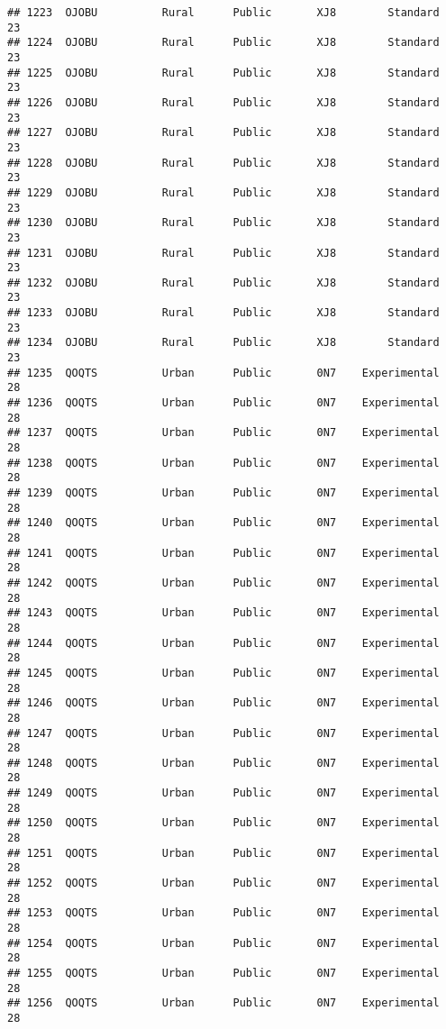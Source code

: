 \documentclass[
]{article}
\begin{document}
\begin{verbatim}
## 1223  OJOBU          Rural      Public       XJ8        Standard        23
## 1224  OJOBU          Rural      Public       XJ8        Standard        23
## 1225  OJOBU          Rural      Public       XJ8        Standard        23
## 1226  OJOBU          Rural      Public       XJ8        Standard        23
## 1227  OJOBU          Rural      Public       XJ8        Standard        23
## 1228  OJOBU          Rural      Public       XJ8        Standard        23
## 1229  OJOBU          Rural      Public       XJ8        Standard        23
## 1230  OJOBU          Rural      Public       XJ8        Standard        23
## 1231  OJOBU          Rural      Public       XJ8        Standard        23
## 1232  OJOBU          Rural      Public       XJ8        Standard        23
## 1233  OJOBU          Rural      Public       XJ8        Standard        23
## 1234  OJOBU          Rural      Public       XJ8        Standard        23
## 1235  QOQTS          Urban      Public       0N7    Experimental        28
## 1236  QOQTS          Urban      Public       0N7    Experimental        28
## 1237  QOQTS          Urban      Public       0N7    Experimental        28
## 1238  QOQTS          Urban      Public       0N7    Experimental        28
## 1239  QOQTS          Urban      Public       0N7    Experimental        28
## 1240  QOQTS          Urban      Public       0N7    Experimental        28
## 1241  QOQTS          Urban      Public       0N7    Experimental        28
## 1242  QOQTS          Urban      Public       0N7    Experimental        28
## 1243  QOQTS          Urban      Public       0N7    Experimental        28
## 1244  QOQTS          Urban      Public       0N7    Experimental        28
## 1245  QOQTS          Urban      Public       0N7    Experimental        28
## 1246  QOQTS          Urban      Public       0N7    Experimental        28
## 1247  QOQTS          Urban      Public       0N7    Experimental        28
## 1248  QOQTS          Urban      Public       0N7    Experimental        28
## 1249  QOQTS          Urban      Public       0N7    Experimental        28
## 1250  QOQTS          Urban      Public       0N7    Experimental        28
## 1251  QOQTS          Urban      Public       0N7    Experimental        28
## 1252  QOQTS          Urban      Public       0N7    Experimental        28
## 1253  QOQTS          Urban      Public       0N7    Experimental        28
## 1254  QOQTS          Urban      Public       0N7    Experimental        28
## 1255  QOQTS          Urban      Public       0N7    Experimental        28
## 1256  QOQTS          Urban      Public       0N7    Experimental        28

\end{verbatim}
\end{document}
